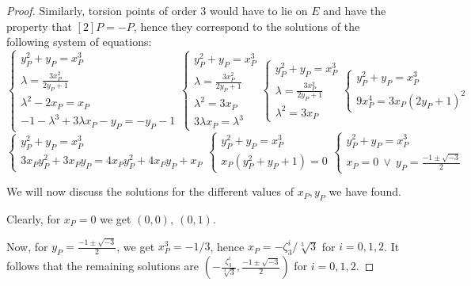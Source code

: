 \documentclass{article}
\begin{document}
\begin{proof}
    Similarly, torsion points of order 3 would have to lie on $E$ and have the
    property that $[2]P=-P$, hence they correspond to the solutions of the
    following system of equations:
    \[
        \begin{cases}
            y_{P}^2+y_P=x_P^3 \\
            \lambda=\frac{3x_P^2}{2y_P+1} \\
            \lambda^2-2x_P=x_P \\
            -1-\lambda^3+3\lambda x_P-y_P=-y_P-1
        \end{cases}
        \begin{cases}
            y_P^2+y_P=x_P^3 \\
            \lambda=\frac{3x_P^2}{2y_P+1} \\
            \lambda^2=3x_P \\
            3\lambda x_P=\lambda^3
        \end{cases}
        \begin{cases}
            y_P^2+y_P=x_P^3 \\
            \lambda=\frac{3x_P^2}{2y_P+1} \\
            \lambda^2=3x_P
        \end{cases}
        \begin{cases}
            y_P^2+y_P=x_P^3 \\
            9x_P^4=3x_P(2y_P+1)^2
        \end{cases}
    \]
    \[
        \begin{cases}
            y_P^2+y_P=x_P^3 \\
            3x_Py_P^2+3x_Py_P=4x_Py_P^2+4x_Py_P+x_P
        \end{cases}
        \begin{cases}
            y_P^2+y_P=x_P^3 \\
            x_P(y_P^2+y_P+1)=0 
        \end{cases}
        \begin{cases}
            y_P^2+y_P=x_P^3 \\
            x_P=0\ \lor\ y_P=\frac{-1\pm\sqrt{-3}}{2}
        \end{cases}
    \]

    We will now discuss the solutions for the different values of $x_P,y_P$ we
    have found.
    
    Clearly, for $x_P=0$ we get $(0,0),\ (0,1)$.
    
    Now, for $y_P=\frac{-1\pm\sqrt{-3}}{2}$, we get $x_P^3=-1/3$, hence
    $x_P=-\zeta_3^i/\sqrt[3]{3}$ for $i=0,1,2$. It follows that the remaining
    solutions are $(-\frac{\zeta_3^i}{\sqrt[3]{3}},\frac{-1\pm\sqrt{-3}}{2})$
    for $i=0,1,2$.
\end{proof}

\printbibliography
\end{document}
